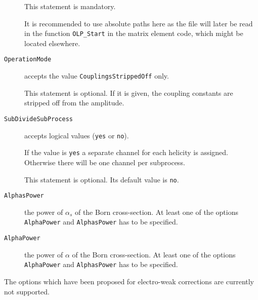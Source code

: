 \documentclass[11pt,a4paper]{refrep}
\begin{document}
\begin{description}
	This statement is mandatory.

	It is recommended to use absolute paths here as the file will later
	be read in the function \texttt{OLP\_Start} in the matrix element
	code, which might be located elsewhere.
\item[\texttt{OperationMode}] accepts the value
	\lstinline!CouplingsStrippedOff! only.

	This statement is optional. If it is given, the coupling constants
	are stripped off from the amplitude.
\item[\texttt{SubDivideSubProcess}] accepts logical values
	(\lstinline!yes! or \lstinline!no!).

	If the value is \lstinline!yes! a separate channel for each
	helicity is assigned. Otherwise there will be one channel per
	subprocess.

	This statement is optional. Its default value is \lstinline!no!.
\item[\texttt{AlphasPower}] the power of $\alpha_s$ of the Born cross-section.
	At least one of the options \lstinline!AlphaPower! and
	\lstinline!AlphasPower! has to be specified.
\item[\texttt{AlphaPower}] the power of $\alpha$ of the Born cross-section.
	At least one of the options \lstinline!AlphaPower! and
	\lstinline!AlphasPower! has to be specified.
\end{description}

The options which have been proposed for electro-weak corrections
are currently not supported.
\end{document}
